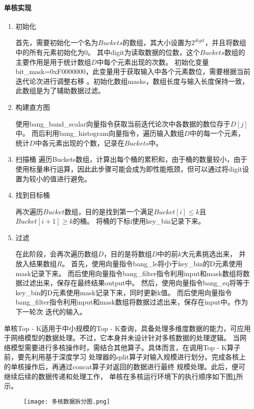   \paragraph{单核实现}
\begin{enumerate}
\item {初始化}

  首先，需要初始化一个名为\(Buckets\)的数组，其大小设置为\(2^{digit}\)，并且将数组中的所有元素初始化为\(0\)。
  其中digit为读取数据的位数，这个\(Buckets\)数组的主要作用是用于统计数组\(D\)中每个元素出现的次数。
  初始化变量bit\_mask=0xF0000000，此变量用于获取输入中各个元素数位，需要根据当前迭代论次进行调整右移
  。初始化数组masks，数组长度与输入长度保持一致，此数组是为了辅助数据过滤。
  \item {构建直方图}

使用bang\_band\_scalar向量指令获取当前迭代论次中各数据的数位存于\(D[j]\)中。
而后利用bang\_histogram向量指令，遍历输入数组\(D\)中的每一个元素，统计\(D\)中各元素出现的个数，记录在\(Buckets\)中。
\item {扫描桶}
遍历Buckets数组，计算出每个桶的累积和，由于桶的数量较小，由于使用标量串行运算，因此此步骤可能会成为即性能瓶颈，但可以通过将digit设置为较小的值进行避免。

\item {找到目标桶}

再次遍历\(Bucket\)数组，目的是找到第一个满足\(Bucket[i] \le k\)且\(Bucket[i+1] \geq k\)的桶。
将桶的下标i使用key\_bin记录下来。

\item{过滤}

  在此阶段，会再次遍历数组\(D\)，目的是将数组\(D\)中的前\(k\)大元素挑选出来，
  并放入结果数组\(R\)。
  首先，使用向量指令bang\_le将小于key\_bin的D元素使用mask记录下来。
  而后使用向量指令bang\_filter指令利用input和mask数组将数据过滤出来，保存在最终结果output中。
  然后，使用向量指令bang\_eq将等于key\_bin的D元素使用mask记录下来，同时更新k值。
  而后使用向量指令bang\_filter指令利用input和mask数组将数据过滤出来，保存在input中。作为下一轮次
  迭代的输入。

\end{enumerate}

单核Top - K适用于中小规模的Top - K查询，具备处理多维度数据的能力，可应用于网络模型的数据处理。不过，它本身并未设计针对多核数据的处理逻辑。
当网络模型需要进行多核操作时，需结合其他算子。具体而言，在调用Top - K算子前，要先利用基于深度学习
处理器的split算子对输入规模进行划分。完成各核上的单核操作后，再通过concat算子对返回的数据进行最终
规模处理。此后，便可继续后续的数据传递和处理工作，
单核在多核运行环境下的执行顺序如下图\ref{fig:duohe_split}所示。
\begin{figure}[ht]
    \centering
    \texttt{[image: 多核数据拆分图.png]}
    \caption{}
    \label{fig:duohe_split}
\end{figure}

